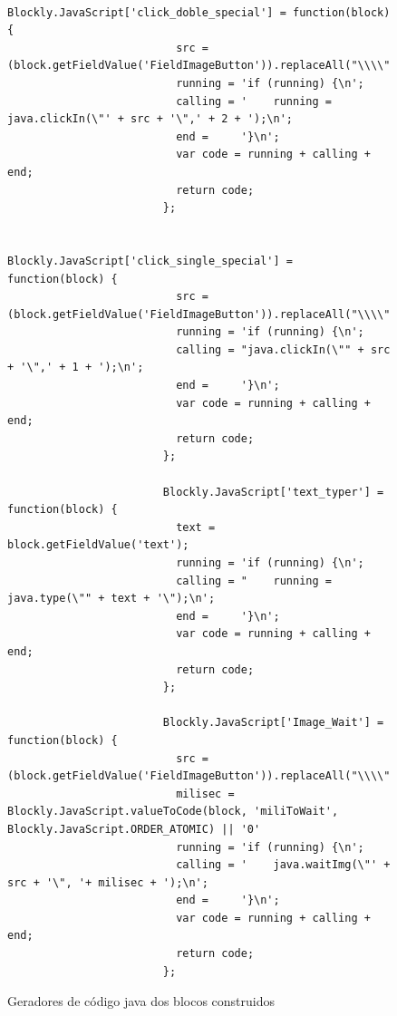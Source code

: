 \documentclass[tg]{mdtufsm}
\begin{document}
                    \begin{figure}[!htb]
                    \begin{lstlisting}
                        Blockly.JavaScript['click_doble_special'] = function(block) {
                          src = (block.getFieldValue('FieldImageButton')).replaceAll("\\\\","\\\\");
                          running = 'if (running) {\n';
                          calling = '    running = java.clickIn(\"' + src + '\",' + 2 + ');\n';
                          end =     '}\n';
                          var code = running + calling + end;
                          return code;
                        };

                        Blockly.JavaScript['click_single_special'] = function(block) {
                          src = (block.getFieldValue('FieldImageButton')).replaceAll("\\\\","\\\\");
                          running = 'if (running) {\n';
                          calling = "java.clickIn(\"" + src + '\",' + 1 + ');\n';
                          end =     '}\n';
                          var code = running + calling + end;
                          return code;
                        };

                        Blockly.JavaScript['text_typer'] = function(block) {
                          text = block.getFieldValue('text');
                          running = 'if (running) {\n';
                          calling = "    running = java.type(\"" + text + '\");\n';
                          end =     '}\n';
                          var code = running + calling + end;
                          return code;
                        };

                        Blockly.JavaScript['Image_Wait'] = function(block) {
                          src = (block.getFieldValue('FieldImageButton')).replaceAll("\\\\","\\\\");
                          milisec = Blockly.JavaScript.valueToCode(block, 'miliToWait', Blockly.JavaScript.ORDER_ATOMIC) || '0'
                          running = 'if (running) {\n';
                          calling = '    java.waitImg(\"' + src + '\", '+ milisec + ');\n';
                          end =     '}\n';
                          var code = running + calling + end;
                          return code;
                        };
                    \end{lstlisting}
                        \caption{Geradores de código java dos blocos construidos}
                        \label{code:myBlocksGenerator.js}
                    \end{figure}
\end{document}
